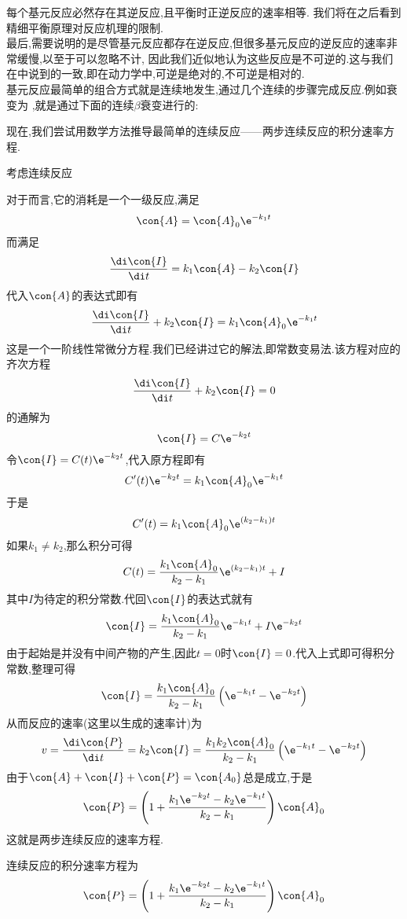 \documentclass{ctexart}
\begin{document}
每个基元反应必然存在其逆反应,且平衡时正逆反应的速率相等.%
我们将在之后看到精细平衡原理对反应机理的限制.\\
\indent 最后,需要说明的是尽管基元反应都存在逆反应,但很多基元反应的逆反应的速率非常缓慢,以至于可以忽略不计,%
因此我们近似地认为这些反应是不可逆的.这与我们在中说到的一致,即在动力学中,可逆是绝对的,不可逆是相对的.\vspace{12pt}\\
\indent 基元反应最简单的组合方式就是连续地发生,通过几个连续的步骤完成反应.例如衰变为%
,就是通过下面的连续$\beta$衰变进行的:
\begin{tightcenter}
\end{tightcenter}
现在,我们尝试用数学方法推导最简单的连续反应——两步连续反应的积分速率方程.
\begin{derivation}
    考虑连续反应
    \begin{tightcenter}
    \end{tightcenter}
    对于而言,它的消耗是一个一级反应,满足
    \[\con{A}=\con{A}_0\e^{-k_1t}\]
    而满足
    \[\dfrac{\di\con{I}}{\di t}=k_1\con{A}-k_2\con{I}\]
    代入$\con{A}$的表达式即有
    \[\dfrac{\di\con{I}}{\di t}+k_2\con{I}=k_1\con{A}_0\e^{-k_1t}\]
    这是一个一阶线性常微分方程.我们已经讲过它的解法,即常数变易法.该方程对应的齐次方程
    \[\dfrac{\di\con{I}}{\di t}+k_2\con{I}=0\]
    的通解为
    \[\con{I}=C\e^{-k_2t}\]
    令$\con{I}=C(t)\e^{-k_2t}$,代入原方程即有
    \[C'(t)\e^{-k_2t}=k_1\con{A}_0\e^{-k_1t}\]
    于是
    \[C'(t)=k_1\con{A}_0\e^{\left(k_2-k_1\right)t}\]
    如果$k_1\neq k_2$,那么积分可得
    \[C(t)=\dfrac{k_1\con{A}_0}{k_2-k_1}\e^{\left(k_2-k_1\right)t}+I\]
    其中$I$为待定的积分常数.代回$\con{I}$的表达式就有
    \[\con{I}=\dfrac{k_1\con{A}_0}{k_2-k_1}\e^{-k_1t}+I\e^{-k_2t}\]
    由于起始是并没有中间产物的产生,因此$t=0$时$\con{I}=0$.代入上式即可得积分常数,整理可得
    \[\con{I}=\dfrac{k_1\con{A}_0}{k_2-k_1}\left(\e^{-k_1t}-\e^{-k_2t}\right)\]
    从而反应的速率(这里以生成的速率计)为
    \[v=\dfrac{\di\con{P}}{\di t}=k_2\con{I}=\dfrac{k_1k_2\con{A}_0}{k_2-k_1}\left(\e^{-k_1t}-\e^{-k_2t}\right)\]
    由于$\con{A}+\con{I}+\con{P}=\con{A_0}$总是成立,于是
    \[\con{P}=\left(1+\dfrac{k_1\e^{-k_2t}-k_2\e^{-k_1t}}{k_2-k_1}\right)\con{A}_0\]
    这就是两步连续反应的速率方程.
\end{derivation}
\begin{theorem}[7C.2.1 两步连续反应的积分速率方程]
    连续反应的积分速率方程为
    \[\con{P}=\left(1+\dfrac{k_1\e^{-k_2t}-k_2\e^{-k_1t}}{k_2-k_1}\right)\con{A}_0\]

\end{theorem}
\end{document}
